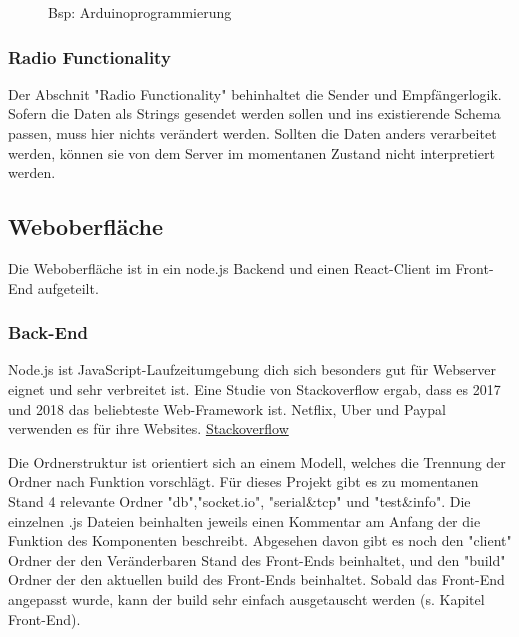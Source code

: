 \documentclass[12pt]{article} %
\begin{document}
\begin{figure}[H]
  \caption{Bsp: Arduinoprogrammierung}
  \label{fig:arduino}
\end{figure}
\subsubsection{Radio Functionality}
Der Abschnit "Radio Functionality" behinhaltet die Sender und Empfängerlogik. Sofern die Daten als Strings gesendet werden sollen und ins existierende Schema passen, muss hier nichts verändert werden. 
Sollten die Daten anders verarbeitet werden, können sie von dem Server im momentanen Zustand nicht interpretiert werden.


\subsection{Weboberfläche} %
Die Weboberfläche ist in ein node.js Backend und einen React-Client im Front-End aufgeteilt. 

\subsubsection{Back-End}
Node.js ist JavaScript-Laufzeitumgebung dich sich besonders gut für Webserver eignet und sehr verbreitet ist. 
Eine Studie von Stackoverflow ergab, dass es 2017 und 2018 das beliebteste Web-Framework ist. 
Netflix, Uber und Paypal verwenden es für ihre Websites. 
\href{https://insights.stackoverflow.com/survey/2018#technology}{Stackoverflow}

Die Ordnerstruktur ist orientiert sich an einem Modell, welches die Trennung der Ordner nach Funktion vorschlägt.
Für dieses Projekt gibt es zu momentanen Stand 4 relevante Ordner "db","socket.io", "serial\&tcp" und "test\&info".
Die einzelnen .js Dateien beinhalten jeweils einen Kommentar am Anfang der die Funktion des Komponenten beschreibt.
Abgesehen davon gibt es noch den "client" Ordner der den Veränderbaren Stand des Front-Ends beinhaltet, und den "build" Ordner der den aktuellen build des Front-Ends beinhaltet.
Sobald das Front-End angepasst wurde, kann der build sehr einfach ausgetauscht werden (s. Kapitel Front-End).
\end{document}
